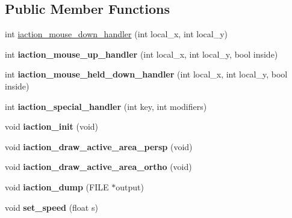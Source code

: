 \subsection*{Public Member Functions}
\begin{DoxyCompactItemize}
\item 
int \hyperlink{classGLUI__Translation_a92ca690a16b858d761aa9e12ac44ec13}{iaction\-\_\-mouse\-\_\-down\-\_\-handler} (int local\-\_\-x, int local\-\_\-y)
\item 
\hypertarget{classGLUI__Translation_a7674b5641e87b9d73a590a9cbfd83783}{int {\bfseries iaction\-\_\-mouse\-\_\-up\-\_\-handler} (int local\-\_\-x, int local\-\_\-y, bool inside)}\label{classGLUI__Translation_a7674b5641e87b9d73a590a9cbfd83783}

\item 
\hypertarget{classGLUI__Translation_a2d13c80e8d6d16378a2f0ceecda7a3c4}{int {\bfseries iaction\-\_\-mouse\-\_\-held\-\_\-down\-\_\-handler} (int local\-\_\-x, int local\-\_\-y, bool inside)}\label{classGLUI__Translation_a2d13c80e8d6d16378a2f0ceecda7a3c4}

\item 
\hypertarget{classGLUI__Translation_a4bdc9a327c975a24546e2733f5f5cb01}{int {\bfseries iaction\-\_\-special\-\_\-handler} (int key, int modifiers)}\label{classGLUI__Translation_a4bdc9a327c975a24546e2733f5f5cb01}

\item 
\hypertarget{classGLUI__Translation_abacc8d8aa4e4a99ab8c6965256ab2bb0}{void {\bfseries iaction\-\_\-init} (void)}\label{classGLUI__Translation_abacc8d8aa4e4a99ab8c6965256ab2bb0}

\item 
\hypertarget{classGLUI__Translation_affbd229a3bb1b680fccfd394a8277440}{void {\bfseries iaction\-\_\-draw\-\_\-active\-\_\-area\-\_\-persp} (void)}\label{classGLUI__Translation_affbd229a3bb1b680fccfd394a8277440}

\item 
\hypertarget{classGLUI__Translation_a78821a339feee6944df3dacbcd7867eb}{void {\bfseries iaction\-\_\-draw\-\_\-active\-\_\-area\-\_\-ortho} (void)}\label{classGLUI__Translation_a78821a339feee6944df3dacbcd7867eb}

\item 
\hypertarget{classGLUI__Translation_ab63de002536cd569083b07006fb3d430}{void {\bfseries iaction\-\_\-dump} (F\-I\-L\-E $\ast$output)}\label{classGLUI__Translation_ab63de002536cd569083b07006fb3d430}

\item 
\hypertarget{classGLUI__Translation_ad05a9584781a60bbbba6a9646dd43f1b}{void {\bfseries set\-\_\-speed} (float s)}\label{classGLUI__Translation_ad05a9584781a60bbbba6a9646dd43f1b}


\end{DoxyCompactItemize}
